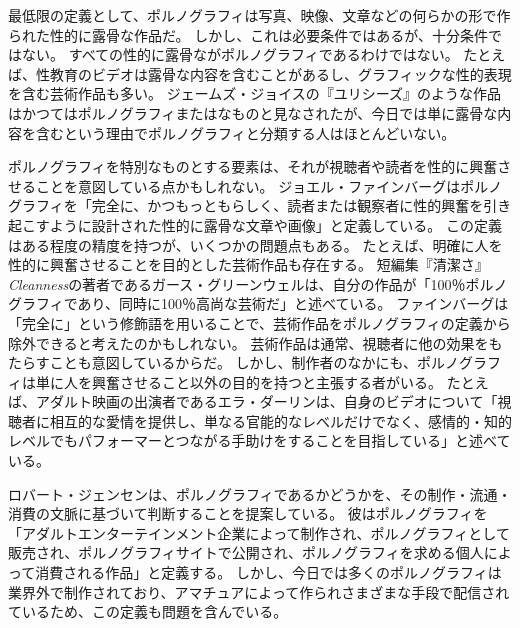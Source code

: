 \documentclass[paper=a4,book,openany]{jlreq}
\newcommand{\ig}[1]{}           %
\begin{document}
最低限の定義として、ポルノグラフィは写真、映像、文章などの何らかの形で作られた性的に露骨な作品だ。
しかし、これは必要条件ではあるが、十分条件ではない。
すべての性的に露骨ながポルノグラフィであるわけではない。
たとえば、性教育のビデオは露骨な内容を含むことがあるし、グラフィックな性的表現を含む芸術作品も多い。
ジェームズ・ジョイスの『ユリシーズ』のような作品はかつてはポルノグラフィまたはなものと見なされたが、今日では単に露骨な内容を含むという理由でポルノグラフィと分類する人はほとんどいない。

ポルノグラフィを特別なものとする要素は、それが視聴者や読者を性的に興奮させることを意図している点かもしれない。
ジョエル・ファインバーグはポルノグラフィを「完全に、かつもっともらしく、読者または観察者に性的興奮を引き起こすように設計された性的に露骨な文章や画像」と定義している\citep[p.127]{feinberg85:_offen_to_other}。
この定義はある程度の精度を持つが、いくつかの問題点もある。
たとえば、明確に人を性的に興奮させることを目的とした芸術作品も存在する。
短編集『清潔さ』\emph{Cleanness}の著者であるガース・グリーンウェルは、自分の作品が「100％ポルノグラフィであり、同時に100％高尚な芸術だ」と述べている\citep{barone20:_garth_green_comes_clean}。
ファインバーグは「完全に」という修飾語を用いることで、芸術作品をポルノグラフィの定義から除外できると考えたのかもしれない。
芸術作品は通常、視聴者に他の効果をもたらすことも意図しているからだ。
しかし、制作者のなかにも、ポルノグラフィは単に人を興奮させること以外の目的を持つと主張する者がいる。
たとえば、アダルト映画の出演者であるエラ・ダーリン\ig{Ella Darling}は、自身のビデオについて「視聴者に相互的な愛情を提供し、単なる官能的なレベルだけでなく、感情的・知的レベルでもパフォーマーとつながる手助けをすることを目指している」と述べている\citep{bell19:_women_are_leadin_porns_lates_reinv}。
\ig{Ella Darling}

ロバート・ジェンセンは、ポルノグラフィであるかどうかを、その制作・流通・消費の文脈に基づいて判断することを提案している。
彼はポルノグラフィを「アダルトエンターテインメント企業によって制作され、ポルノグラフィとして販売され、ポルノグラフィサイトで公開され、ポルノグラフィを求める個人によって消費される作品」と定義する\citep[p.53]{jensen07:gettingoff}。
しかし、今日では多くのポルノグラフィは業界外で制作されており、アマチュアによって作られさまざまな手段で配信されているため、この定義も問題を含んでいる。
\end{document}
